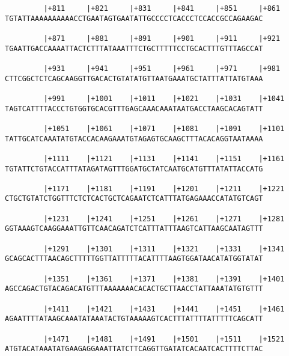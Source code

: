 \documentclass{article}
\begin{document}
\begin{Verbatim}
         |+811     |+821     |+831     |+841     |+851     |+861
TGTATTAAAAAAAAAACCTGAATAGTGAATATTGCCCCTCACCCTCCACCGCCAGAAGAC
                                                            
         |+871     |+881     |+891     |+901     |+911     |+921
TGAATTGACCAAAATTACTCTTTATAAATTTCTGCTTTTTCCTGCACTTTGTTTAGCCAT
                                                            
         |+931     |+941     |+951     |+961     |+971     |+981
CTTCGGCTCTCAGCAAGGTTGACACTGTATATGTTAATGAAATGCTATTTATTATGTAAA
                                                            
         |+991     |+1001    |+1011    |+1021    |+1031    |+1041
TAGTCATTTTACCCTGTGGTGCACGTTTGAGCAAACAAATAATGACCTAAGCACAGTATT
                                                            
         |+1051    |+1061    |+1071    |+1081    |+1091    |+1101
TATTGCATCAAATATGTACCACAAGAAATGTAGAGTGCAAGCTTTACACAGGTAATAAAA
                                                            
         |+1111    |+1121    |+1131    |+1141    |+1151    |+1161
TGTATTCTGTACCATTTATAGATAGTTTGGATGCTATCAATGCATGTTTATATTACCATG
                                                            
         |+1171    |+1181    |+1191    |+1201    |+1211    |+1221
CTGCTGTATCTGGTTTCTCTCACTGCTCAGAATCTCATTTATGAGAAACCATATGTCAGT
                                                            
         |+1231    |+1241    |+1251    |+1261    |+1271    |+1281
GGTAAAGTCAAGGAAATTGTTCAACAGATCTCATTTATTTAAGTCATTAAGCAATAGTTT
                                                            
         |+1291    |+1301    |+1311    |+1321    |+1331    |+1341
GCAGCACTTTAACAGCTTTTTGGTTATTTTTACATTTTAAGTGGATAACATATGGTATAT
                                                            
         |+1351    |+1361    |+1371    |+1381    |+1391    |+1401
AGCCAGACTGTACAGACATGTTTAAAAAAACACACTGCTTAACCTATTAAATATGTGTTT
                                                            
         |+1411    |+1421    |+1431    |+1441    |+1451    |+1461
AGAATTTTATAAGCAAATATAAATACTGTAAAAAGTCACTTTATTTTATTTTTCAGCATT
                                                            
         |+1471    |+1481    |+1491    |+1501    |+1511    |+1521
ATGTACATAAATATGAAGAGGAAATTATCTTCAGGTTGATATCACAATCACTTTTCTTAC
                                                            

\end{Verbatim}
\end{document}

